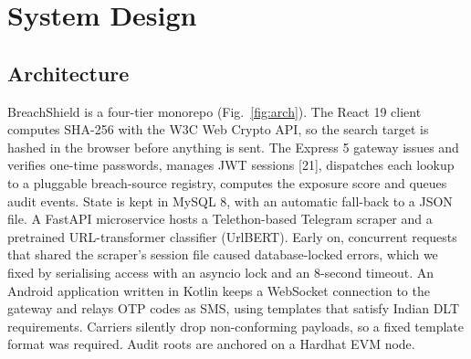 \documentclass[10pt,twocolumn]{article}
\begin{document}
\section{System Design}

\subsection{Architecture}

BreachShield is a four-tier monorepo (Fig.~\ref{fig:arch}). The React 19 client computes SHA-256 with the W3C Web Crypto API, so the search target is hashed in the browser before anything is sent. The Express 5 gateway issues and verifies one-time passwords, manages JWT sessions [21], dispatches each lookup to a pluggable breach-source registry, computes the exposure score and queues audit events. State is kept in MySQL 8, with an automatic fall-back to a JSON file. A FastAPI microservice hosts a Telethon-based Telegram scraper and a pretrained URL-transformer classifier (UrlBERT). Early on, concurrent requests that shared the scraper's session file caused database-locked errors, which we fixed by serialising access with an asyncio lock and an 8-second timeout. An Android application written in Kotlin keeps a WebSocket connection to the gateway and relays OTP codes as SMS, using templates that satisfy Indian DLT requirements. Carriers silently drop non-conforming payloads, so a fixed template format was required. Audit roots are anchored on a Hardhat EVM node.
\end{document}
